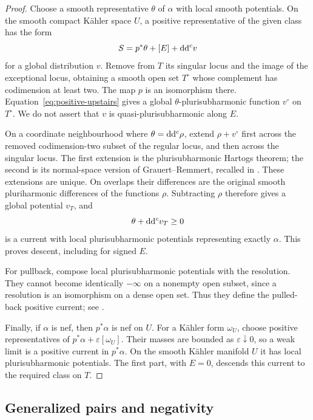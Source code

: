 \begin{proof}
Choose a smooth representative $\theta$ of $\alpha$ with local smooth
potentials.  On the smooth compact K\"ahler space $U$, a positive
representative of the given class has the form
\begin{equation}\label{eq:positive-upstairs}
 S=p^*\theta+[E]+\mathrm{d}\mathrm{d}^{c} v
\end{equation}
for a global distribution $v$.  Remove from $T$ its singular locus
and the image of the exceptional locus, obtaining a smooth open set
$T^\circ$ whose complement has codimension at least two.  The map
$p$ is an isomorphism there.  Equation~\eqref{eq:positive-upstairs}
gives a global $\theta$-plurisubharmonic function $v^\circ$ on
$T^\circ$.  We do not assert that $v$ is quasi-plurisubharmonic along
$E$.

On a coordinate neighbourhood where $\theta=\mathrm{d}\mathrm{d}^{c}\rho$, extend
$\rho+v^\circ$ first across the removed codimension-two subset of
the regular locus, and then across the singular locus.  The first
extension is the plurisubharmonic Hartogs theorem; the second is its
normal-space version of Grauert--Remmert, recalled in
\cite[Section~2.1, pp.~927--928]{CMM2017}.  These extensions are unique.
On overlaps their differences are the original smooth
pluriharmonic differences of the functions $\rho$.  Subtracting
$\rho$ therefore gives a global potential $v_T$, and
\[
 \theta+\mathrm{d}\mathrm{d}^{c} v_T\geq0
\]
is a current with local plurisubharmonic potentials representing
exactly $\alpha$.  This proves descent, including for signed $E$.

For pullback, compose local plurisubharmonic potentials with the
resolution.  They cannot become identically $-\infty$ on a nonempty
open subset, since a resolution is an isomorphism on a dense open
set.  Thus they define the pulled-back positive current; see
\cite[Section~2.1, p.~928]{CMM2017}.

Finally, if $\alpha$ is nef, then $p^*\alpha$ is nef on $U$.
For a K\"ahler form $\omega_U$, choose positive representatives of
$p^*\alpha+\varepsilon[\omega_U]$.  Their masses are bounded as
$\varepsilon\downarrow0$, so a weak limit is a positive current in
$p^*\alpha$.  On the smooth K\"ahler manifold $U$ it has local
plurisubharmonic potentials.  The first part, with $E=0$, descends
this current to the required class on $T$.
\end{proof}

\subsection{Generalized pairs and negativity}

